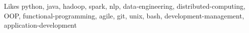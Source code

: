 

\begin{cvskills}

  \cvskill
    {Likes} %
    {python, java, hadoop, spark, nlp, data-engineering, distributed-computing, OOP, functional-programming, agile, git, unix, bash, development-management, application-development} %


\end{cvskills}
